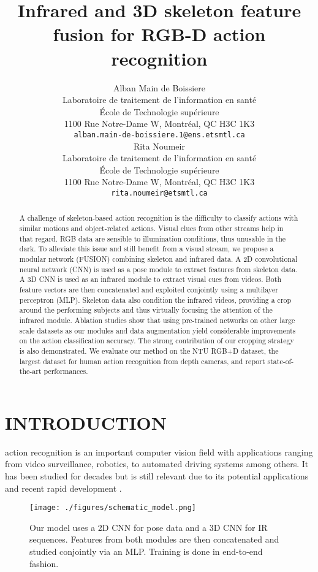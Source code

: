 \documentclass[letterpaper, 10 pt, conference]{ieeeconf}
\title{\LARGE \bf
Infrared and 3D skeleton feature fusion for RGB-D action recognition
}
\author{ \parbox{3 in}{\centering Alban Main de Boissiere\\
        Laboratoire de traitement de l’information en santé\\
        École de Technologie supérieure\\
        1100 Rue Notre-Dame W, Montréal, QC H3C 1K3\\
        {\tt\small alban.main-de-boissiere.1@ens.etsmtl.ca}}
        \hspace*{ 0.5 in}
        \parbox{3 in}{ \centering Rita Noumeir\\
        Laboratoire de traitement de l’information en santé\\
        École de Technologie supérieure\\
        1100 Rue Notre-Dame W, Montréal, QC H3C 1K3\\
        {\tt\small rita.noumeir@etsmtl.ca}}
}
\begin{document}
\maketitle
\thispagestyle{empty}
\pagestyle{empty}

\begin{abstract}

A challenge of skeleton-based action recognition is the difficulty to classify actions with similar motions and object-related actions. Visual clues from other streams help in that regard. RGB data are sensible to illumination conditions, thus unusable in the dark. To alleviate this issue and still benefit from a visual stream, we propose a modular network (FUSION) combining skeleton and infrared data. A 2D convolutional neural network (CNN) is used as a pose module to extract features from skeleton data. A 3D CNN is used as an infrared module to extract visual cues from videos. Both feature vectors are then concatenated and exploited conjointly using a multilayer perceptron (MLP). Skeleton data also condition the infrared videos, providing a crop around the performing subjects and thus virtually focusing the attention of the infrared module. Ablation studies show that using pre-trained networks on other large scale datasets as our modules and data augmentation yield considerable improvements on the action classification accuracy. The strong contribution of our cropping strategy is also demonstrated. We evaluate our method on the NTU RGB+D dataset, the largest dataset for human action recognition from depth cameras, and report state-of-the-art performances. 

\end{abstract}


\section{INTRODUCTION}
 action recognition is an important computer vision field with applications ranging from video surveillance, robotics, to automated driving systems among others. It has been studied for decades but is still relevant due to its potential applications and recent rapid development \cite{wang2018rgb}. 

\begin{figure}[t]
  \centering
  \texttt{[image: ./figures/schematic\_model.png]}
  \caption{Our model uses a 2D CNN for pose data and a 3D CNN for IR sequences. Features from both modules are then concatenated and studied conjointly via an MLP. Training is done in end-to-end fashion.}
  \label{schematic_model}
\end{figure}
\end{document}
